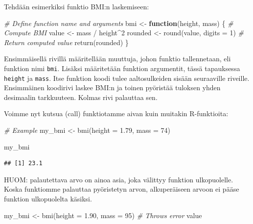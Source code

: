 \documentclass[
]{book}
\newenvironment{Shaded}{\begin{snugshade}}{\end{snugshade}}
\newcommand{\AttributeTok}[1]{\textcolor[rgb]{0.77,0.63,0.00}{#1}}
\newcommand{\CommentTok}[1]{\textcolor[rgb]{0.56,0.35,0.01}{\textit{#1}}}
\newcommand{\ControlFlowTok}[1]{\textcolor[rgb]{0.13,0.29,0.53}{\textbf{#1}}}
\newcommand{\DecValTok}[1]{\textcolor[rgb]{0.00,0.00,0.81}{#1}}
\newcommand{\FloatTok}[1]{\textcolor[rgb]{0.00,0.00,0.81}{#1}}
\newcommand{\FunctionTok}[1]{\textcolor[rgb]{0.00,0.00,0.00}{#1}}
\newcommand{\NormalTok}[1]{#1}
\newcommand{\OtherTok}[1]{\textcolor[rgb]{0.56,0.35,0.01}{#1}}
\newcommand{\SpecialCharTok}[1]{\textcolor[rgb]{0.00,0.00,0.00}{#1}}
\begin{document}
Tehdään esimerkiksi funktio BMI:n laskemiseen:

\begin{Shaded}
\begin{Highlighting}[]
\CommentTok{\# Define function name and arguments}
\NormalTok{bmi }\OtherTok{\textless{}{-}} \ControlFlowTok{function}\NormalTok{(height, mass) \{}
  \CommentTok{\# Compute BMI}
\NormalTok{  value }\OtherTok{\textless{}{-}}\NormalTok{ mass }\SpecialCharTok{/}\NormalTok{ height}\SpecialCharTok{\^{}}\DecValTok{2}
\NormalTok{  rounded }\OtherTok{\textless{}{-}} \FunctionTok{round}\NormalTok{(value, }\AttributeTok{digits =} \DecValTok{1}\NormalTok{)}
  \CommentTok{\# Return computed value}
  \FunctionTok{return}\NormalTok{(rounded)}
\NormalTok{\}}
\end{Highlighting}
\end{Shaded}

Ensimmäisellä rivillä määritellään muuttuja, johon funktio tallennetaan, eli funktion nimi \texttt{bmi}. Lisäksi määritetään funktion argumentit, tässä tapauksessa \texttt{height} ja \texttt{mass}. Itse funktion koodi tulee aaltosulkeiden sisään seuraaville riveille. Ensimmäinen koodirivi laskee BMI:n ja toinen pyöristää tuloksen yhden desimaalin tarkkuuteen. Kolmas rivi palauttaa sen.

Voimme nyt kutsua (call) funktiotamme aivan kuin muitakin R-funktioita:

\begin{Shaded}
\begin{Highlighting}[]
\CommentTok{\# Example}
\NormalTok{my\_bmi }\OtherTok{\textless{}{-}} \FunctionTok{bmi}\NormalTok{(}\AttributeTok{height =} \FloatTok{1.79}\NormalTok{, }\AttributeTok{mass =} \DecValTok{74}\NormalTok{)}

\NormalTok{my\_bmi}
\end{Highlighting}
\end{Shaded}

\begin{verbatim}
## [1] 23.1
\end{verbatim}

HUOM: palautettava arvo on ainoa asia, joka välittyy funktion ulkopuolelle. Koska funktiomme palauttaa pyöristetyn arvon, alkuperäiseen arvoon ei pääse funktion ulkopuolelta käsiksi.

\begin{Shaded}
\begin{Highlighting}[]
\NormalTok{my\_bmi }\OtherTok{\textless{}{-}} \FunctionTok{bmi}\NormalTok{(}\AttributeTok{height =} \FloatTok{1.90}\NormalTok{, }\AttributeTok{mass =} \DecValTok{95}\NormalTok{)}
\CommentTok{\# Throws error}
\NormalTok{value}
\end{Highlighting}
\end{Shaded}
\end{document}
